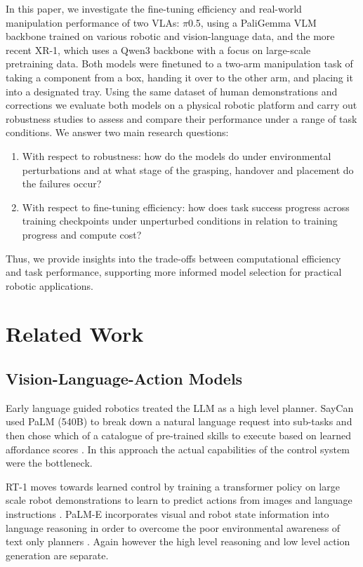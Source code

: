 \documentclass[10pt,twocolumn,letterpaper]{article}
\begin{document}
In this paper, we investigate the fine-tuning efficiency and real-world manipulation performance of two VLAs: $\pi$0.5, using a PaliGemma VLM backbone trained on various robotic and vision-language data, and the more recent XR-1, which uses a Qwen3 backbone with a focus on large-scale pretraining data. Both models were finetuned to a two-arm manipulation task of taking a component from a box, handing it over to the other arm, and placing it into a designated tray. Using the same dataset of human demonstrations and corrections we evaluate both models on a physical robotic platform and carry out robustness studies to assess and compare their performance under a range of task conditions.
We answer two main research questions: 
\begin{enumerate}
    \item With respect to robustness: how do the models do under environmental perturbations and at what stage of the grasping, handover and placement do the failures occur?
    \item With respect to fine-tuning efficiency: how does task success progress across training checkpoints under unperturbed conditions in relation to training progress and compute cost?
\end{enumerate}
Thus, we provide insights into the trade-offs between computational efficiency and task performance, supporting more informed model selection for practical robotic applications.

\section{Related Work}

\subsection{Vision-Language-Action Models}
Early language guided robotics treated the LLM as a high level planner. SayCan used PaLM (540B) to break down a natural language request into sub-tasks and then chose which of a catalogue of pre-trained skills to execute based on learned affordance scores \cite{ahn2022saycan}. In this approach the actual capabilities of the control system were the bottleneck.

RT-1 moves towards learned control by training a transformer policy on large scale robot demonstrations to learn to predict actions from images and language instructions \cite{brohan2023rt1}. PaLM-E incorporates visual and robot state information into language reasoning in order to overcome the poor environmental awareness of text only planners \cite{driess2023palme}. Again however the high level reasoning and low level action generation are separate.
\end{document}
